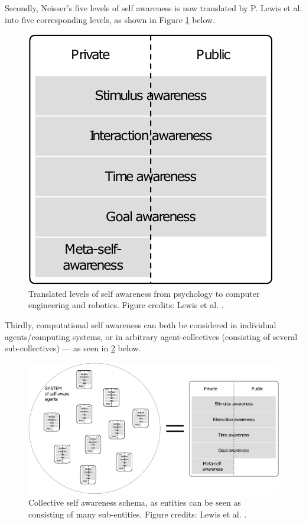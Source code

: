 	Secondly, Neisser's five levels of self awareness is now translated by P. Lewis et al. \cite{sacs16_ch2} into five corresponding levels, as shown in Figure \ref{fig:comp_SA_levels} below.

	\begin{figure}[!htp]
		\centering
		\includegraphics[width=0.5\columnwidth]{Assets/DocSegments/Chapters/Background/Figures/Schema/SA_levels.pdf}
		\caption[Translated levels of self awareness from psychology to computer engineering and robotics.]{Translated levels of self awareness from psychology to computer engineering and robotics. Figure credits: Lewis et al. \cite{sacs16_ch2}.}
		\label{fig:comp_SA_levels}
	\end{figure}

	Thirdly, computational self awareness can both be considered in individual agents/computing systems, or in arbitrary agent-collectives (consisting of several sub-collectives) — as seen in \ref{fig:collective_SA} below.

	\begin{figure}[!htp]
		\centering
		\includegraphics[width=\columnwidth]{Assets/DocSegments/Chapters/Background/Figures/Schema/collective_SA.pdf}
		\caption[Collective self awareness schema.]{Collective self awareness schema, as entities can be seen as consisting of many sub-entities. Figure credits: Lewis et al. \cite{sacs16_ch2}.}
		\label{fig:collective_SA}
	\end{figure}

